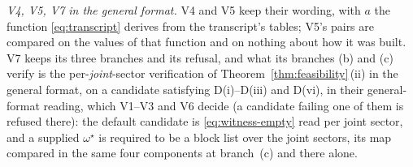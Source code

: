 \begin{definition}
\emph{V4, V5, V7 in the general format.} V4 and V5 keep their wording, with
$a$ the function \eqref{eq:transcript} derives from the transcript's tables;
V5's pairs are compared on the values of that function and on nothing about
how it was built. V7 keeps its three branches and its refusal, and what its
branches (b) and (c) verify is the per-\emph{joint}-sector verification of
Theorem~\ref{thm:feasibility}\,(ii) in the general format, on a candidate
satisfying D(i)--D(iii) and D(vi), in their general-format reading, which
V1--V3 and V6 decide (a candidate failing one of them is refused there): the
default candidate is
\eqref{eq:witness-empty} read per joint sector, and a supplied
$\omega^{\star}$ is required to be a block list over the joint sectors, its
map compared in the same four components at branch~(c) and there alone.


\end{definition}

